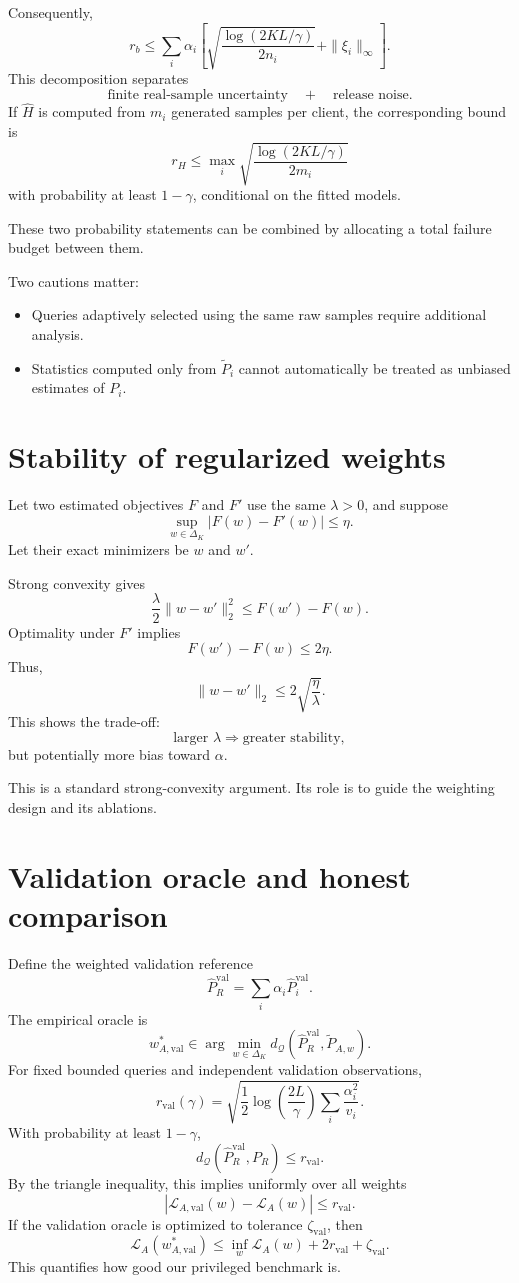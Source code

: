 \documentclass[11pt,a4paper]{article}
\begin{document}
Consequently,
\[
\boxed{r_b\leq\sum_i\alpha_i\left[
\sqrt{\frac{\log(2KL/\gamma)}{2n_i}}+\|\xi_i\|_\infty\right].}
\]
This decomposition separates
\[
\text{finite real-sample uncertainty}\quad+\quad\text{release noise}.
\]
If $\widehat H$ is computed from $m_i$ generated samples per client, the corresponding bound is
\[
\boxed{r_H\leq\max_i\sqrt{\frac{\log(2KL/\gamma)}{2m_i}}}
\]
with probability at least $1-\gamma$, conditional on the fitted models.

These two probability statements can be combined by allocating a total failure budget between them.

Two cautions matter:
\begin{itemize}
\item Queries adaptively selected using the same raw samples require additional analysis.
\item Statistics computed only from $\widetilde P_i$ cannot automatically be treated as unbiased estimates of $P_i$.
\end{itemize}

\section{Stability of regularized weights}
Let two estimated objectives $F$ and $F'$ use the same $\lambda>0$, and suppose
\[
\sup_{w\in\Delta_K}|F(w)-F'(w)|\leq\eta.
\]
Let their exact minimizers be $w$ and $w'$.

Strong convexity gives
\[
\frac{\lambda}{2}\|w-w'\|_2^2\leq F(w')-F(w).
\]
Optimality under $F'$ implies
\[
F(w')-F(w)\leq2\eta.
\]
Thus,
\[
\boxed{\|w-w'\|_2\leq2\sqrt{\frac{\eta}{\lambda}}.}
\]
This shows the trade-off:
\[
\text{larger }\lambda\Rightarrow\text{greater stability},
\]
but potentially more bias toward $\alpha$.

This is a standard strong-convexity argument. Its role is to guide the weighting design and its ablations.

\section{Validation oracle and honest comparison}
Define the weighted validation reference
\[
\widehat P_R^{\mathrm{val}}=\sum_i\alpha_i\widehat P_i^{\mathrm{val}}.
\]
The empirical oracle is
\[
\boxed{w^*_{A,\mathrm{val}}\in\arg\min_{w\in\Delta_K}
d_{\mathcal Q}\left(\widehat P_R^{\mathrm{val}},\widetilde P_{A,w}\right).}
\]
For fixed bounded queries and independent validation observations,
\[
r_{\mathrm{val}}(\gamma)=\sqrt{\frac12\log\left(\frac{2L}{\gamma}\right)
\sum_i\frac{\alpha_i^2}{v_i}}.
\]
With probability at least $1-\gamma$,
\[
d_{\mathcal Q}\left(\widehat P_R^{\mathrm{val}},P_R\right)\leq r_{\mathrm{val}}.
\]
By the triangle inequality, this implies uniformly over all weights
\[
\left|\mathcal L_{A,\mathrm{val}}(w)-\mathcal L_A(w)\right|\leq r_{\mathrm{val}}.
\]
If the validation oracle is optimized to tolerance $\zeta_{\mathrm{val}}$, then
\[
\boxed{\mathcal L_A(w^*_{A,\mathrm{val}})\leq
\inf_w\mathcal L_A(w)+2r_{\mathrm{val}}+\zeta_{\mathrm{val}}.}
\]
This quantifies how good our privileged benchmark is.
\end{document}
